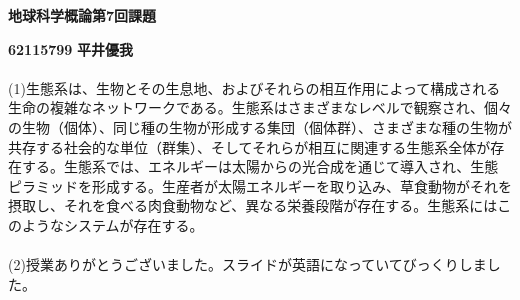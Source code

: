 \documentclass[a4paper,10.5pt]{ltjsarticle}
\begin{document}
\centerline
{\huge \bfseries 地球科学概論第7回課題}
\leftline
{\bfseries 62115799}
{\bfseries 平井優我}\\
\\
(1)生態系は、生物とその生息地、およびそれらの相互作用によって構成される生命の複雑なネットワークである。生態系はさまざまなレベルで観察され、個々の生物（個体）、同じ種の生物が形成する集団（個体群）、さまざまな種の生物が共存する社会的な単位（群集）、そしてそれらが相互に関連する生態系全体が存在する。生態系では、エネルギーは太陽からの光合成を通じて導入され、生態ピラミッドを形成する。生産者が太陽エネルギーを取り込み、草食動物がそれを摂取し、それを食べる肉食動物など、異なる栄養段階が存在する。生態系にはこのようなシステムが存在する。
\\
\\
(2)授業ありがとうございました。スライドが英語になっていてびっくりしました。
\end{document}
